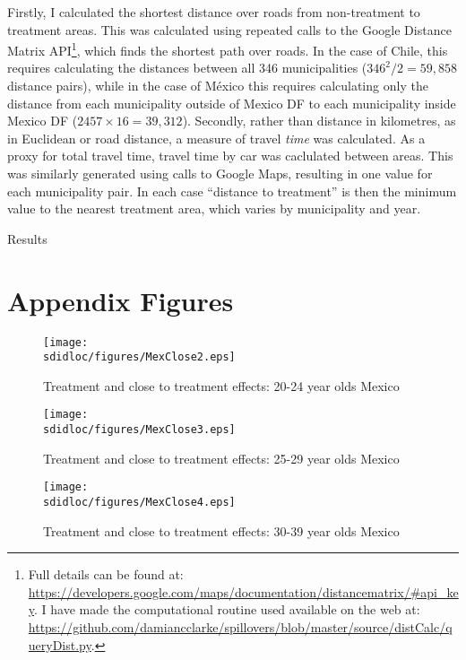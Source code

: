 Firstly, I calculated the shortest distance over roads from non-treatment to 
treatment areas.  This was calculated using repeated calls to the Google 
Distance Matrix API\footnote{Full details can be found at:
\url{https://developers.google.com/maps/documentation/distancematrix/\#api\_key}.
I have made the computational routine used available on the web at:
\url{https://github.com/damiancclarke/spillovers/blob/master/source/distCalc/queryDist.py}.}, 
which finds the shortest path over roads.  In the case of Chile, this requires 
calculating the distances between all 346  municipalities ($346^2/2=59,858$ 
distance pairs), while in the case of M\'exico this requires calculating only 
the distance from each municipality outside of Mexico DF to each municipality 
inside Mexico DF ($2457\times 16=39,312$).  Secondly, rather than distance in 
kilometres, as in Euclidean or road distance, a measure of travel \emph{time} 
was calculated.  As a proxy for total travel time, travel time by car was 
caclulated between areas.  This was similarly generated using calls to Google 
Maps, resulting in one value for each municipality pair.  In each case 
``distance to treatment'' is then the minimum value to the nearest treatment 
area, which varies by municipality and year.

Results 
\clearpage


\section{Appendix Figures}
\label{Sscn:Agraphs}
\begin{figure}[htpb!]
\texttt{[image: \\sdidloc/figures/MexClose2.eps]}
\caption{Treatment and close to treatment effects: 20-24 year olds Mexico}
\end{figure}
\begin{figure}[htpb!]
\texttt{[image: \\sdidloc/figures/MexClose3.eps]}
\caption{Treatment and close to treatment effects: 25-29 year olds Mexico}
\end{figure}
\begin{figure}[htpb!]
\texttt{[image: \\sdidloc/figures/MexClose4.eps]}
\caption{Treatment and close to treatment effects: 30-39 year olds Mexico}
\end{figure}

